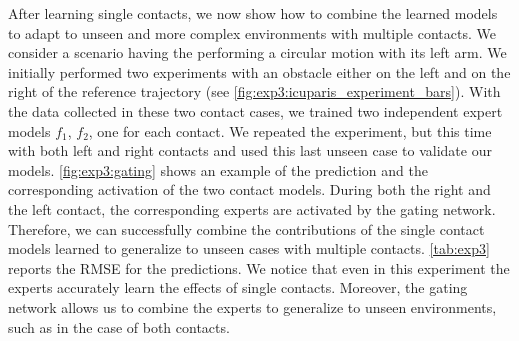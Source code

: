     After learning single contacts, we now show how to combine the learned models to adapt to unseen and more complex environments with multiple contacts.
	We consider a scenario having the \robot{} performing a circular motion with its left arm.
	We initially performed two experiments with an obstacle either on the left and on the right of the reference trajectory (see \fig\ref{fig:exp3:icuparis_experiment_bars}).
	With the data collected in these two contact cases, we trained two independent expert models $f_1$, $f_2$, one for each contact.
	We repeated the experiment, but this time with both left and right contacts 
    and used this last unseen case to validate our models. 
\fig\ref{fig:exp3:gating} shows an example of the prediction and the corresponding activation of the two contact models. 
	During both the right and the left contact, the corresponding experts are activated by the gating network.
	Therefore, we can successfully combine the contributions of the single contact models learned to generalize to unseen cases with multiple contacts.
	 \tab\ref{tab:exp3} reports the RMSE for the predictions.
     We notice that even in this experiment the experts accurately learn the effects of single contacts.
     Moreover, the gating network allows us to combine the experts to generalize to unseen environments, such as in the case of both contacts. 
     


